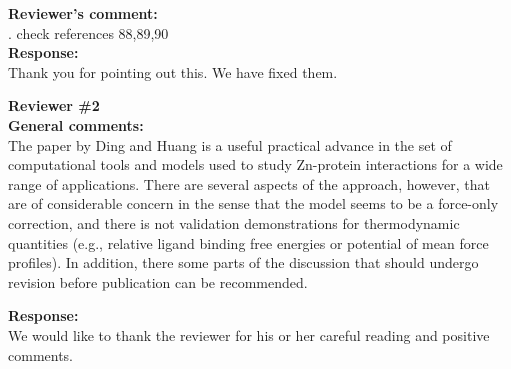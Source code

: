 \documentclass[doublespace,prb,aps,preprint]{revtex4}
\newenvironment{Comment}{ {\bf \indent Reviewer's comment: \\} \setlength{\parindent}{1cm}  \sffamily }{ \ignorespacesafterend \\}
\newenvironment{GeneralComment}{ {\bf \indent General comments: \\} \setlength{\parindent}{1cm}  \sffamily }{ \ignorespacesafterend \\}
\newenvironment{Reply}{  {\bf Response: \\}  \setlength{\parindent}{1cm} \normalfont }{ \ignorespacesafterend \vspace{5mm}}
\begin{document}
\begin{Comment}
8. check references 88,89,90
\end{Comment}
\begin{Reply}
Thank you for pointing out this. We have fixed them.
\end{Reply}


\vspace{5mm}

\bigskip
\bigskip
\bigskip

\textbf{Reviewer \#2} \\
\begin{GeneralComment}
The paper by Ding and Huang is a useful practical advance in the set of computational tools and models used to study Zn-protein interactions for a wide range of applications.
There are several aspects of the approach, however, that are of considerable concern in the sense that the model seems to be a force-only correction, 
and there is not validation demonstrations for thermodynamic quantities (e.g., relative ligand binding free energies or potential of mean force profiles). 
In addition, there some parts of the discussion that should undergo revision before publication can be recommended.
\end{GeneralComment}

\begin{Reply}
We would like to thank the reviewer for his or her careful reading and positive comments. 
\end{Reply}
\end{document}
